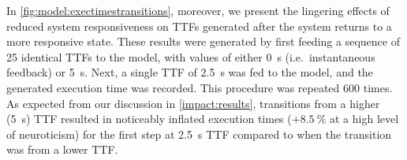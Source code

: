 In \cref{fig:model:exectimestransitions}, moreover, we present the lingering effects of reduced system responsiveness on \glspl{TTF} generated after the system returns to a more responsive state.
These results were generated by first feeding a sequence of \num{25} identical \glspl{TTF} to the model, with values of either \SI{0}{\second} (i.e.\ instantaneous feedback) or \SI{5}{\second}.
Next, a single \gls{TTF} of \SI{2.5}{\second} was fed to the model, and the generated execution time was recorded.
This procedure was repeated \num{600} times.
As expected from our discussion in \cref{impact:results}, transitions from a higher (\SI{5}{\second}) \gls{TTF} resulted in noticeably inflated execution times (\ensuremath{+\SI{8.5}{\percent}} at a high level of neuroticism) for the first step at \SI{2.5}{\second} \gls{TTF} compared to when the transition was from a lower \gls{TTF}.
